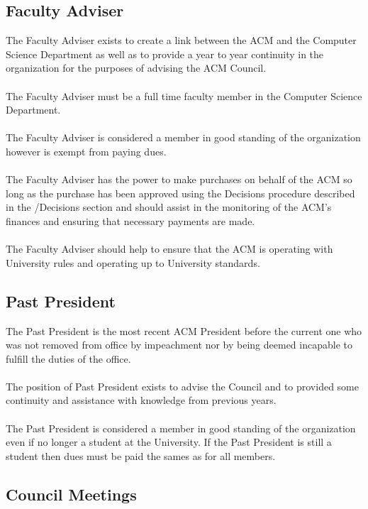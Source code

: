 \documentclass[12pt,titlepage]{article}
\begin{document}
\subsection{Faculty Adviser}

The Faculty Adviser exists to create a link between the ACM and the Computer Science Department as well as to provide a year to year continuity in the organization for the purposes of advising the ACM Council.\\
\\
The Faculty Adviser must be a full time faculty member in the Computer Science Department.\\
\\
The Faculty Adviser is considered a member in good standing of the organization however is exempt from paying dues.\\
\\
The Faculty Adviser has the power to make purchases on behalf of the ACM so long as the purchase has been approved using the Decisions procedure described in the /Decisions section and should assist in the monitoring of the ACM's finances and ensuring that necessary payments are made.\\
\\
The Faculty Adviser should help to ensure that the ACM is operating with University rules and operating up to University standards.

\subsection{Past President}

The Past President is the most recent ACM President before the current one who was not removed from office by impeachment nor by being deemed incapable to fulfill the duties of the office.\\
\\
The position of Past President exists to advise the Council and to provided some continuity and assistance with knowledge from previous years.\\
\\
The Past President is considered a member in good standing of the organization even if no longer a student at the University. If the Past President is still a student then dues must be paid the sames as for all members.

\subsection{Council Meetings}
\end{document}
